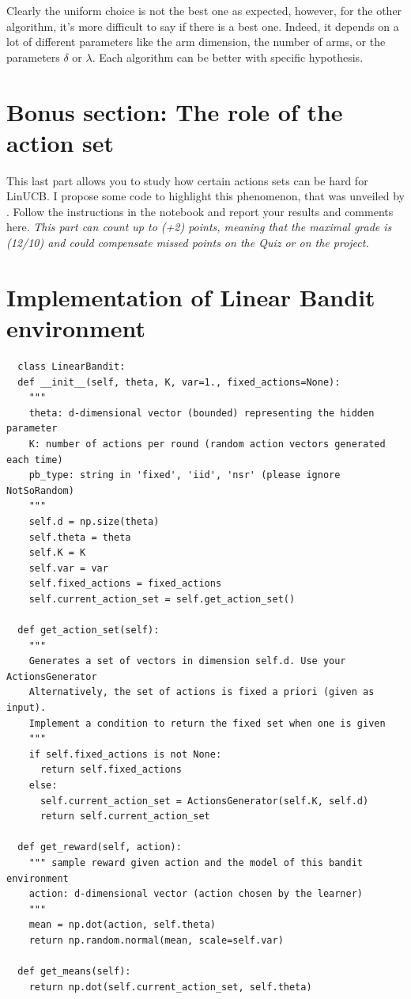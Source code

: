 Clearly the uniform choice is not the best one as expected, however, for the other algorithm, it's more difficult to say if there is a best one. 
Indeed, it depends on a lot of different parameters like the arm dimension, the number of arms, or the parameters $\delta$ or $\lambda$.
Each algorithm can be better with specific hypothesis.





\newpage





\appendix

\section{Bonus section: The role of the action set}

This last part allows you to study how certain actions sets can be hard for LinUCB. I propose some code to highlight this phenomenon, that was unveiled by \citet{lattimore2017end}. 
Follow the instructions in the notebook and report your results and comments here. 
\emph{This part can count up to (+2) points, meaning that the maximal grade is (12/10) and could compensate missed points on the Quiz or on the project. }


\section{Implementation of \textbf{Linear Bandit} environment}
\begin{verbatim}
  class LinearBandit:
  def __init__(self, theta, K, var=1., fixed_actions=None):
    """
    theta: d-dimensional vector (bounded) representing the hidden parameter
    K: number of actions per round (random action vectors generated each time)
    pb_type: string in 'fixed', 'iid', 'nsr' (please ignore NotSoRandom)
    """
    self.d = np.size(theta)
    self.theta = theta
    self.K = K
    self.var = var
    self.fixed_actions = fixed_actions
    self.current_action_set = self.get_action_set()

  def get_action_set(self):
    """
    Generates a set of vectors in dimension self.d. Use your ActionsGenerator
    Alternatively, the set of actions is fixed a priori (given as input).
    Implement a condition to return the fixed set when one is given
    """
    if self.fixed_actions is not None:
      return self.fixed_actions
    else:
      self.current_action_set = ActionsGenerator(self.K, self.d)
      return self.current_action_set

  def get_reward(self, action):
    """ sample reward given action and the model of this bandit environment
    action: d-dimensional vector (action chosen by the learner)
    """
    mean = np.dot(action, self.theta)
    return np.random.normal(mean, scale=self.var)

  def get_means(self):
    return np.dot(self.current_action_set, self.theta)
\end{verbatim}


